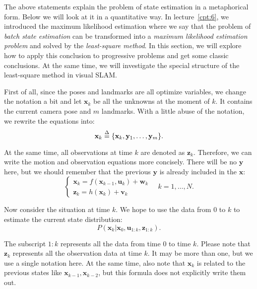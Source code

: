 The above statements explain the problem of state estimation in a metaphorical form. Below we will look at it in a quantitative way. In lecture~\ref{cpt:6}, we introduced the maximum likelihood estimation where we say that the problem of \textit{batch state estimation} can be transformed into a \textit{maximum likelihood estimation problem} and solved by the \textit{least-square method}. In this section, we will explore how to apply this conclusion to progressive problems and get some classic conclusions. At the same time, we will investigate the special structure of the least-square method in visual SLAM.

First of all, since the poses and landmarks are all optimize variables, we change the notation a bit and let $\mathbf{x}_k$ be all the unknowns at the moment of $k$. It contains the current camera pose and $m$ landmarks. With a little abuse of the notation, we rewrite the equations into:
\begin{equation}
	\mathbf{x}_k  \buildrel \Delta \over =  \{ \mathbf{x}_k, \mathbf{y}_1, \ldots, \mathbf{y}_m \}.
\end{equation}

At the same time, all observations at time $k$ are denoted as $\mathbf{z}_k$. Therefore, we can write the motion and observation equations more concisely. There will be no $\mathbf{y}$ here, but we should remember that the previous $\mathbf{y}$ is already included in the $\mathbf{x}$:
\begin{equation}
	\left\{ \begin{array}{l}
		{\mathbf{x}_k} = f\left( {{\mathbf{x}_{k - 1}},{\mathbf{u}_k}} \right) + \mathbf{w}_k \\
		{\mathbf{z}_{k}} = h\left( \mathbf{x}_k  \right)+ \mathbf{v}_{k}
	\end{array} \right. \quad k=1, \ldots, N .
\end{equation}

Now consider the situation at time $k$. We hope to use the data from $0$ to $k$ to estimate the current state distribution:
\begin{equation}
	P(\mathbf{x}_k | \mathbf{x}_0, \mathbf{u}_{1:k}, \mathbf{z}_{1:k}).
\end{equation}

The subscript $1:k$ represents all the data from time $0$ to time $k$. Please note that $\mathbf{z}_k$ represents all the observation data at time $k$. It may be more than one, but we use a single notation here. At the same time, also note that $\mathbf{x}_k$ is related to the previous states like $\mathbf{x}_{k-1}, \mathbf{x}_{k-2}$, but this formula does not explicitly write them out.

